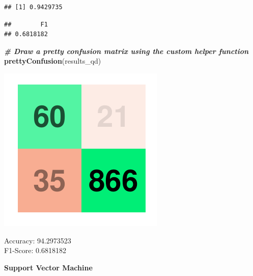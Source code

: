 \documentclass[
]{article}
\newenvironment{Shaded}{\begin{snugshade}}{\end{snugshade}}
\newcommand{\CommentTok}[1]{\textcolor[rgb]{0.00,0.40,1.00}{\textbf{\textit{#1}}}}
\newcommand{\DataTypeTok}[1]{\textcolor[rgb]{0.74,0.68,0.62}{\underline{#1}}}
\newcommand{\KeywordTok}[1]{\textcolor[rgb]{0.26,0.66,0.93}{\textbf{#1}}}
\newcommand{\NormalTok}[1]{\textcolor[rgb]{0.74,0.68,0.62}{#1}}
\newcommand{\OperatorTok}[1]{\textcolor[rgb]{0.74,0.68,0.62}{#1}}
\newcommand{\StringTok}[1]{\textcolor[rgb]{0.02,0.61,0.04}{#1}}
\begin{document}
\begin{verbatim}
## [1] 0.9429735
\end{verbatim}

\begin{Shaded}
\end{Shaded}

\begin{verbatim}
##        F1 
## 0.6818182
\end{verbatim}

\begin{Shaded}
\begin{Highlighting}[]
\CommentTok{# Draw a pretty confusion matrix using the custom helper function}
\KeywordTok{prettyConfusion}\NormalTok{(results_qd)}
\end{Highlighting}
\end{Shaded}

\includegraphics{Bank_Loan_Classification_files/figure-latex/unnamed-chunk-32-1.pdf}

Accuracy: 94.2973523\\
F1-Score: 0.6818182

\textbf{Support Vector Machine}
\end{document}
